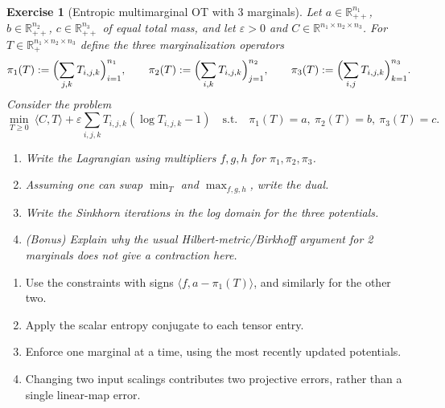 \documentclass[11pt,a4paper]{article}
\theoremstyle{exostyle}
\newtheorem{exercise}{Exercise}
\newcommand{\ip}[2]{\langle #1,#2\rangle}
\begin{document}
\begin{exercise}[Entropic multimarginal OT with 3 marginals]\label{ex:multimarginal}
Let $a\in\mathbb R_{++}^{n_1}$, $b\in\mathbb R_{++}^{n_2}$, $c\in\mathbb R_{++}^{n_3}$ of equal total mass, and let $\varepsilon>0$ and $C\in\mathbb R^{n_1\times n_2\times n_3}$. For $T\in\mathbb R_+^{n_1\times n_2\times n_3}$ define the three marginalization operators
\[
\pi_1(T) := \Bigl( \sum_{j,k} T_{i,j,k} \Bigr)_{i=1}^{n_1},\qquad
\pi_2(T) := \Bigl( \sum_{i,k} T_{i,j,k} \Bigr)_{j=1}^{n_2},\qquad
\pi_3(T) := \Bigl( \sum_{i,j} T_{i,j,k} \Bigr)_{k=1}^{n_3}.
\]
Consider the problem
\[
\min_{T\ge 0} \ \ip{C}{T} + \varepsilon \sum_{i,j,k} T_{i,j,k}(\log T_{i,j,k}-1)
\quad\text{s.t.}\quad
\pi_1(T)=a,\ \pi_2(T)=b,\ \pi_3(T)=c.
\]
\begin{enumerate}[label=\textbf{(\arabic*)}]
  \item Write the Lagrangian using multipliers $f,g,h$ for $\pi_1,\pi_2,\pi_3$.
  \item Assuming one can swap $\min_T$ and $\max_{f,g,h}$, write the dual.
  \item Write the Sinkhorn iterations in the log domain for the three potentials.
  \item \textit{(Bonus)} Explain why the usual Hilbert-metric/Birkhoff argument for 2 marginals does not give a contraction here.
\end{enumerate}
\end{exercise}
\begin{hints}
\begin{enumerate}[label=(\arabic*)]\item Use the constraints with signs $\langle f,a-\pi_1(T)\rangle$, and similarly for the other two.\item Apply the scalar entropy conjugate to each tensor entry.\item Enforce one marginal at a time, using the most recently updated potentials.\item Changing two input scalings contributes two projective errors, rather than a single linear-map error.\end{enumerate}
\end{hints}
\end{document}
